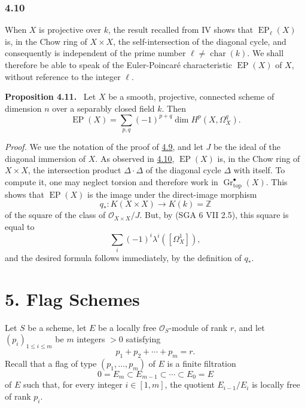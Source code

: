 \documentclass[11pt]{article}
\newenvironment{statement}[1]{\par\medskip\noindent\textbf{#1.}\ }{\par\medskip}
\begin{document}
\subsubsection*{4.10}\label{sga5:VII:subsubsection:4.10}
When $X$ is projective over $k$, the result recalled from IV shows that $\operatorname{EP}_\ell(X)$ is, in the Chow ring of $X\times X$, the self-intersection of the diagonal cycle, and consequently is independent of the prime number $\ell\ne\operatorname{char}(k)$. We shall therefore be able to speak of the Euler-Poincaré characteristic $\operatorname{EP}(X)$ of $X$, without reference to the integer $\ell$.

\label{sga5:VII:proposition:4.11}\begin{statement}{Proposition 4.11}
Let $X$ be a smooth, projective, connected scheme of dimension $n$ over a separably closed field $k$. Then
\[
\operatorname{EP}(X)=\sum_{p,q}(-1)^{p+q}\dim H^p(X,\Omega_X^q).
\]
\end{statement}

\emph{Proof.} We use the notation of the proof of \hyperref[sga5:VII:corollary:4.9]{4.9}, and let $J$ be the ideal of the diagonal immersion of $X$. As observed in \hyperref[sga5:VII:subsubsection:4.10]{4.10}, $\operatorname{EP}(X)$ is, in the Chow ring of $X\times X$, the intersection product $\Delta\cdot\Delta$ of the diagonal cycle $\Delta$ with itself. To compute it, one may neglect torsion and therefore work in $\operatorname{Gr}_{\mathrm{top}}^\bullet(X)$. This shows that $\operatorname{EP}(X)$ is the image under the direct-image morphism
\[
q_*:K(X\times X)\to K(k)=\mathbb Z
\]
of the square of the class of $\mathcal O_{X\times X}/J$. But, by (SGA 6 VII 2.5), this square is equal to
\[
\sum_i(-1)^i\lambda^i([\Omega_X^1]),
\]
and the desired formula follows immediately, by the definition of $q_*$.

\section*{5. Flag Schemes}\label{sga5:VII:section:5}

Let $S$ be a scheme, let $E$ be a locally free $\mathcal O_S$-module of rank $r$, and let $(p_i)_{1\le i\le m}$ be $m$ integers $>0$ satisfying
\[
p_1+p_2+\cdots+p_m=r.
\]
Recall that a flag of type $(p_1,\ldots,p_m)$ of $E$ is a finite filtration
\[
0=E_m\subset E_{m-1}\subset\cdots\subset E_0=E
\]
of $E$ such that, for every integer $i\in[1,m]$, the quotient $E_{i-1}/E_i$ is locally free of rank $p_i$.
\end{document}
